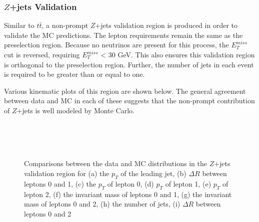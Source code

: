 \subsubsection{$Z$+jets Validation}

Similar to $t\bar{t}$, a non-prompt $Z$+jets validation region is produced in order to validate the MC predictions. The lepton requirements remain the same as the preselection region. Because no neutrinos are present for this process, the $E_T^{miss}$ cut is reversed, requiring $E_T^{miss}$ < 30 GeV. This also ensures this validation region is orthogonal to the preselection region. Further, the number of jets in each event is required to be greater than or equal to one. 

Various kinematic plots of this region are shown below. The general agreement between data and MC in each of these suggests that the non-prompt contribution of $Z$+jets is well modeled by Monte Carlo.

\begin{figure}[H]
    \\
    \\
    \\
    \caption{Comparisons between the data and MC distributions in the $Z$+jets validation region for (a) the $p_T$ of the leading jet, (b) $\Delta R$ between leptons 0 and 1, (c) the $p_T$ of lepton 0, (d) $p_T$ of lepton 1, (e) $p_T$ of lepton 2, (f) the invariant mass of leptons 0 and 1, (g) the invariant mass of leptons 0 and 2, (h) the number of jets, (i) $\Delta R$ between leptons 0 and 2}%
    \label{zjets_kinematics}
\end{figure}

